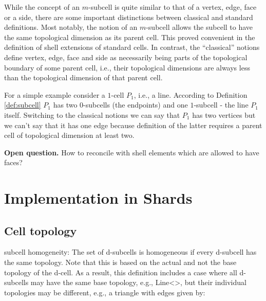 \documentclass[pdf,12pt,relaxed]{SANDreport}
\begin{document}
While the concept of an $m$-subcell is quite similar to that of a vertex, edge, face or a side, there are some important distinctions between classical and standard definitions. Most notably, the notion of an $m$-subcell allows the subcell to have the same topological dimension as its parent cell. This proved convenient in the definition of shell extensions of standard cells. 
In contrast, the ``classical'' notions define vertex, edge, face and side as necessarily being parts of the topological boundary of some parent cell, i.e., their topological dimensions are always less than the topological dimension of that parent cell.

For a simple example consider a $1$-cell $P_1$, i.e., a line. According to Definition \ref{def:subcell} $P_1$ has two $0$-subcells (the endpoints) and one $1$-subcell - the line $P_1$ itself. Switching to the classical notions we can say 
that $P_1$ has two vertices but we can't say that  it has one edge because definition of the latter requires a parent cell of topological dimension at least two.



\textbf{Open question.} How to reconcile with shell elements which are allowed to have faces?





    
    
    \section{Implementation in Shards}\label{sec:implementation}
    
    
        
    
    \subsection{Cell topology}
   
    
    
    subcell homogeneity: The set of d-subcells is homogeneous if every d-subcell has the same topology.
    Note that this is based on the actual and not the base topology of the d-cell. As a result, this definition includes a case where all d-subcells may have the same base topology, e.g., Line<>, but their individual topologies may be different, e.g., a triangle with edges given by:
\end{document}
